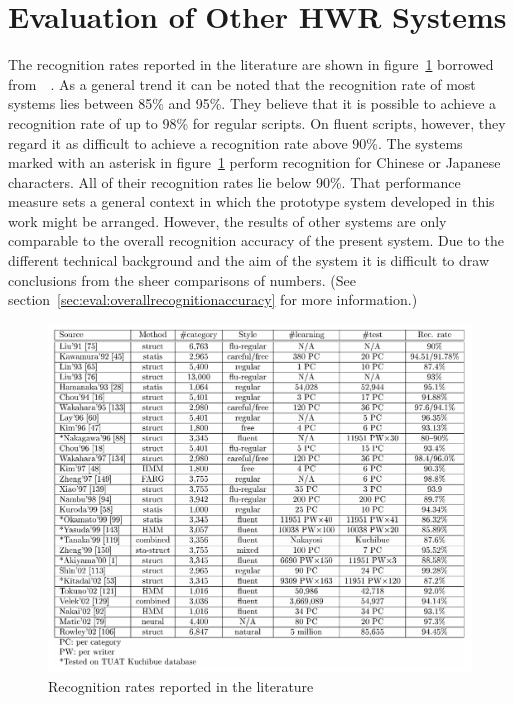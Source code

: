 


\section{Evaluation of Other HWR Systems}
\label{sec:eval:othersystems}

The recognition rates reported in the literature are shown in 
figure~\ref{fig:recognitionratesreported} borrowed 
from~~\citeyear{LiuJaegerNakagawa2004}.
As a general trend it can be noted that the recognition rate of most systems
lies between 85\% and 95\%. They believe that it is possible to achieve a 
recognition rate of up to 98\% for regular scripts. On fluent scripts, however,
they regard it as difficult to achieve a recognition rate above 90\%.
The systems marked with an asterisk in figure~\ref{fig:recognitionratesreported}
perform recognition for Chinese or Japanese characters. All of their recognition
rates lie below 90\%. That performance measure sets a general context in which 
the prototype system developed in this work might be arranged.
However, the results of other systems are only comparable to the overall 
recognition accuracy of the present system. Due to the different technical
background and the aim of the system it is difficult to draw conclusions
from the sheer comparisons of numbers. 
(See section~\ref{sec:eval:overallrecognitionaccuracy} for more information.)
\begin{figure}[htbp]
  \begin{center}
    \includegraphics[scale=0.6]{images/recognitionRatesLiuJaeger.png}
    \caption{Recognition rates reported in the literature}
    \label{fig:recognitionratesreported}
  \end{center}
\end{figure}


